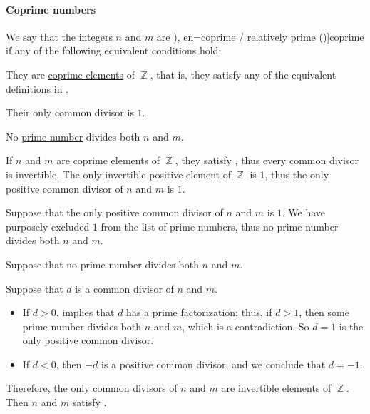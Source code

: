 \paragraph{Coprime numbers}

\begin{definition}\label{def:coprime_numbers}
  We say that the integers \( n \) and \( m \) are \term[ru=взаимно простые (числа) (\cite[45]{Зорич2019АнализЧасть1}), en=coprime / relatively prime (\cite[231]{Rosen2018DiscreteHandbook})]{coprime} if any of the following equivalent conditions hold:
  \begin{thmenum}
    \mimprovised They are \hyperref[def:coprime_elements]{coprime elements} of \( \BbbZ \), that is, they satisfy any of the equivalent definitions in .

     Their only  common divisor is \( 1 \).

    \mimprovised No \hyperref[def:prime_number]{prime number} divides both \( n \) and \( m \).
  \end{thmenum}
\end{definition}
\begin{defproof}
   If \( n \) and \( m \) are coprime elements of \( \BbbZ \), they satisfy , thus every common divisor is invertible. The only invertible positive element of \( \BbbZ \) is \( 1 \), thus the only positive common divisor of \( n \) and \( m \) is \( 1 \).

   Suppose that the only positive common divisor of \( n \) and \( m \) is \( 1 \). We have purposely excluded \( 1 \) from the list of prime numbers, thus no prime number divides both \( n \) and \( m \).

   Suppose that no prime number divides both \( n \) and \( m \).

  Suppose that \( d \) is a common divisor of \( n \) and \( m \).

  \begin{itemize}
    \item If \( d > 0 \),  implies that \( d \) has a prime factorization; thus, if \( d > 1 \), then some prime number divides both \( n \) and \( m \), which is a contradiction. So \( d = 1 \) is the only positive common divisor.

    \item If \( d < 0 \), then \( -d \) is a positive common divisor, and we conclude that \( d = -1 \).
  \end{itemize}

  Therefore, the only common divisors of \( n \) and \( m \) are invertible elements of \( \BbbZ \). Then \( n \) and \( m \) satisfy .
\end{defproof}

